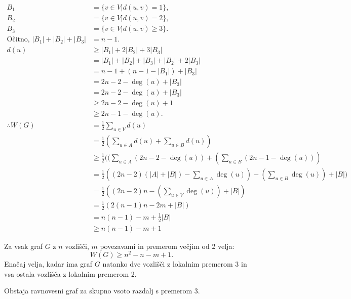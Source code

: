 \documentclass[fin1, tisk]{fmfdelo}
\begin{document}
\begin{dokaz}
\begin{align*}
B_1 &= \{v \in V | d(u,v) = 1\}, \\
B_2 &= \{v \in V | d(u,v) = 2\}, \\
B_3 &= \{v \in V | d(u,v) \geq 3\}. \\
\text{Očitno, } |B_1| + |B_2| + |B_3| &= n - 1. \\
d(u) &\geq |B_1| + 2|B_2| + 3|B_3| \\
&= |B_1| + |B_2| + |B_3| + |B_2| + 2|B_3| \\
&= n - 1+ (n - 1 - |B_1|)+ | B_3| \\
&= 2n-2-\deg(u) + | B_3| \\
&= 2n-2-\deg(u) + | B_3| \\
&\geq 2n-2-\deg(u)+1 \\
&\geq 2n-1-\deg(u). \\
\therefore W(G) &= \frac{1}{2} \sum_{u \in V} d(u) \\
&=\frac{1}{2}(\sum_{u \in A} d(u) + \sum_{u \in B} d(u)) \\
&\geq \frac{1}{2}((\sum_{u \in A} (2n-2-\deg(u))+(\sum_{u \in B} (2n-1-\deg(u))) \\
&=\frac{1}{2}((2n-2)(|A| + |B|) - \sum_{u \in A} \deg(u))-(\sum_{u \in B} \deg(u))+ |B|) \\
&=\frac{1}{2}((2n-2)n - (\sum_{u \in V} \deg(u)) + |B|) \\
&=\frac{1}{2}(2(n-1)n - 2m + |B|) \\
&=n(n - 1) - m + \frac{1}{2}|B| \\
&\geq n(n - 1) - m + 1
\end{align*}
\end{dokaz}

\begin{posledica}
Za vsak graf \(G\) z \(n\) vozlišči, \(m\) povezavami in premerom večjim od 2 velja:
\[
W(G) \geq n^2 - n - m + 1.
\]
Enačaj velja, kadar ima graf \(G\) natanko dve vozlišči z lokalnim premerom 3 in vsa ostala vozlišča z lokalnim premerom 2.
\end{posledica}

\begin{izrek}
Obstaja ravnovesni graf za skupno vsoto razdalj s premerom 3.
\end{izrek}
\end{document}
